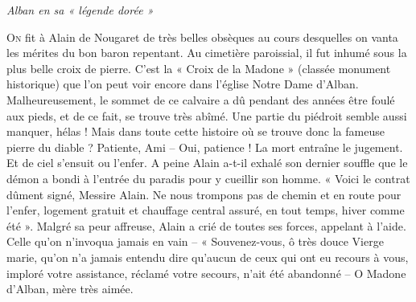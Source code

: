 
\begin{center}
  {\Large\itshape Alban en sa « légende dorée »}
\end{center}
\vspace{1.5em}

\noindent
\lettrine{O}{n} fit à Alain de Nougaret de très belles obsèques au cours desquelles on vanta les mérites du bon baron repentant. Au cimetière paroissial, il fut inhumé sous la plus belle croix de pierre. C'est la « Croix de la Madone » (classée monument historique) que l'on peut voir encore dans l'église Notre Dame d'Alban. Malheureusement, le sommet de ce calvaire a dû pendant des années être foulé aux pieds, et de ce fait, se trouve très abîmé. Une partie du piédroit semble aussi manquer, hélas ! Mais dans toute cette histoire où se trouve donc la fameuse pierre du diable ? Patiente, Ami – Oui, patience ! La mort entraîne le jugement. Et de ciel s'ensuit ou l'enfer. A peine Alain a-t-il exhalé son dernier souffle que le démon a bondi à l'entrée du paradis pour y cueillir son homme. « Voici le contrat dûment signé, Messire Alain. Ne nous trompons pas de chemin et en route pour l'enfer, logement gratuit et chauffage central assuré, en tout temps, hiver comme été ». Malgré sa peur affreuse, Alain a crié de toutes ses forces, appelant à l'aide. Celle qu'on n'invoqua jamais en vain – « Souvenez-vous, ô très douce Vierge marie, qu'on n'a jamais entendu dire qu'aucun de ceux qui ont eu recours à vous, imploré votre assistance, réclamé votre secours, n'ait été abandonné – O Madone d'Alban, mère très aimée.
